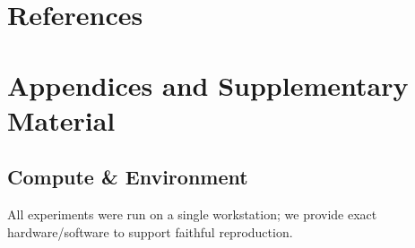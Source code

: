 \documentclass{article}
\begin{document}

\newpage

\section{References}
\nocite{*}




\newpage
\appendix

\section{Appendices and Supplementary Material}

\subsection{Compute \& Environment}
\label{sec:compute}
All experiments were run on a single workstation; we provide exact hardware/software to support faithful reproduction.
\end{document}
